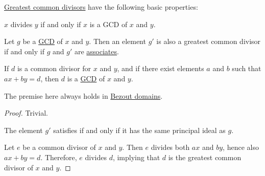 \begin{proposition}\label{thm:def:gcd}
  \hyperref[def:gcd]{Greatest common divisors} have the following basic properties:
  \begin{thmenum}
     \( x \) divides \( y \) if and only if \( x \) is a GCD of \( x \) and \( y \).

     Let \( g \) be a \hyperref[def:gcd]{GCD} of \( x \) and \( y \). Then an element \( g' \) is also a greatest common divisor if and only if \( g \) and \( g' \) are \hyperref[def:domain_divisibility/associates]{associates}.

     If \( d \) is a common divisor for \( x \) and \( y \), and if there exist elements \( a \) and \( b \) such that \( ax + by = d \), then \( d \) is a \hyperref[def:gcd]{GCD} of \( x \) and \( y \).

    The premise here always holds in \hyperref[def:bezout_domain]{Bezout domains}.
  \end{thmenum}
\end{proposition}
\begin{proof}
   Trivial.

   The element \( g' \) satisfies  if and only if it has the same principal ideal as \( g \).

   Let \( e \) be a common divisor of \( x \) and \( y \). Then \( e \) divides both \( ax \) and \( by \), hence also \( ax + by = d \). Therefore, \( e \) divides \( d \), implying that \( d \) is the greatest common divisor of \( x \) and \( y \).
\end{proof}

